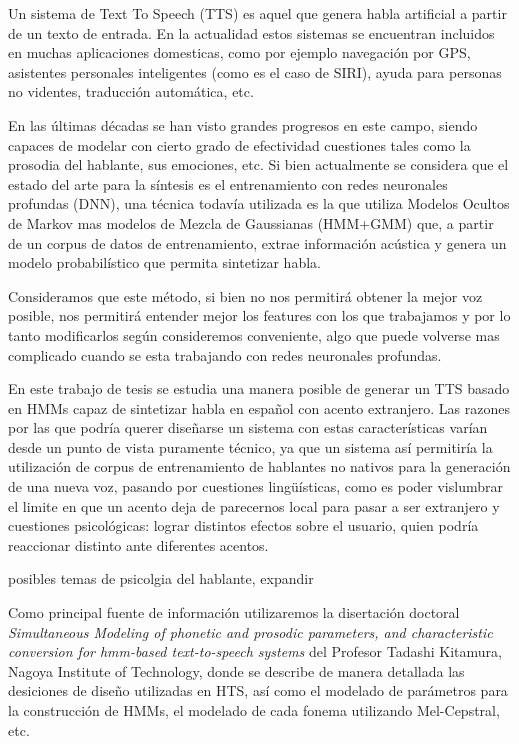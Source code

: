 
\noindent Un sistema de Text To Speech (TTS) es aquel que genera habla artificial a partir de un texto de entrada. En la actualidad estos sistemas se encuentran incluidos en muchas aplicaciones domesticas, como por ejemplo navegación por GPS, asistentes personales inteligentes (como es el caso de SIRI), ayuda para personas no videntes, traducción automática, etc.

\noindent En las últimas décadas se han visto grandes progresos en este campo, siendo capaces de modelar con cierto grado de efectividad cuestiones tales como la prosodia del hablante, sus emociones, etc. Si bien actualmente se considera que el estado del arte para la síntesis es el entrenamiento con redes neuronales profundas (DNN), una técnica todavía utilizada es la que utiliza Modelos Ocultos de Markov mas modelos de Mezcla de Gaussianas (HMM+GMM) que, a partir de un corpus de datos de entrenamiento, extrae información acústica y genera un modelo probabilístico que permita sintetizar habla. 

\noindent Consideramos que este método, si bien no nos permitirá obtener la mejor voz posible, nos permitirá entender mejor los features con los que trabajamos y por lo tanto modificarlos según consideremos conveniente, algo que puede volverse mas complicado cuando se esta trabajando con redes neuronales profundas.

\noindent En este trabajo de tesis se estudia una manera posible de generar un TTS basado en HMMs capaz de sintetizar habla en español con acento extranjero. Las razones por las que podría querer diseñarse un sistema con estas características varían \expandir desde un punto de vista puramente técnico, ya que un sistema así permitiría la utilización de corpus de entrenamiento de hablantes no nativos para la generación de una nueva voz, pasando por cuestiones lingüísticas, como es poder vislumbrar el limite en que un acento deja de parecernos local para pasar a ser extranjero y cuestiones psicológicas: lograr distintos efectos sobre el usuario, quien podría reaccionar distinto ante diferentes acentos.

posibles temas de psicolgia del hablante, expandir

\calzarMasAdelante

\reescribir
\noindent Como principal fuente de información utilizaremos la disertación doctoral \textit{Simultaneous Modeling of phonetic and prosodic parameters, and characteristic conversion for hmm-based text-to-speech systems} del Profesor Tadashi Kitamura, Nagoya Institute of Technology\cite{phoneticAndProsodic}, donde se describe de manera detallada las desiciones de diseño utilizadas en HTS, así como el modelado de parámetros para la construcción de HMMs, el modelado de cada fonema utilizando Mel-Cepstral, etc.

